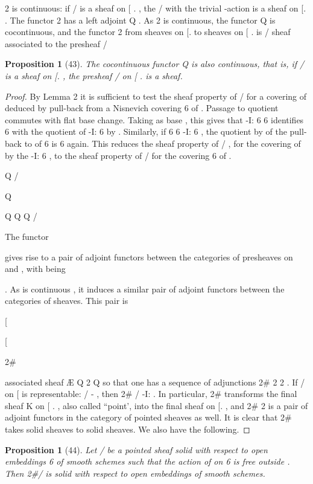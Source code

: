 \documentclass[11pt,a4paper]{article}
\theoremstyle{plain}
\newtheorem{proposition}[theorem]{Proposition}
\theoremstyle{definition}
\begin{document}
2 is continuous: if / is a sheaf on [ .   , the
  / with the trivial -action
is a sheaf on [.   . The functor 2 has a left adjoint Q
   . As 2
is continuous, the functor Q is cocontinuous, and the functor 2 from sheaves on
[.   to sheaves on [ .   is
/  sheaf associated to the presheaf   / 
\begin{proposition}[43]
The cocontinuous functor Q    is also continuous, that
is, if / is a sheaf on [.   , the presheaf   /  on [ .   is a sheaf.
\end{proposition}

\begin{proof} By Lemma 2 it is sufficient to test the sheaf property of   /  for a
covering of  deduced by pull-back from a Nisnevich covering 6
 of  .
Passage to quotient commutes with flat base change. Taking as base  , this gives
that
 -I: 6 6
identifies 6 with the quotient of  -I: 6 by . Similarly, if 6
6 -I: 6 ,
the quotient by of the pull-back to  of 6 is 6 again. This reduces the sheaf
property of   / , for the covering of  by the  -I: 6 , to the sheaf
property of / for the covering 6  of  .



Q
/ 


Q




Q  Q 
Q / 

The functor

gives rise to a pair of adjoint functors
between the categories of presheaves on
and
, with
being

. As
is continuous , it induces a similar pair of adjoint functors
between the categories of sheaves. This pair is



[ 

[

2\#

associated sheaf Æ Q  2 Q 
so that one has a sequence of adjunctions 2\#  2  2 . If / on [  is representable: /
- , then 2\# / 
-I: . In particular, 2\# transforms the final sheaf
K on [ .   , also called ``point', into the final sheaf on [.   , and 2\#  2 
is a pair of adjoint functors in the category of pointed sheaves as well. It is clear that
2\# takes solid sheaves to solid sheaves. We also have the following.
\end{proof}

\begin{proposition}[44]
Let / be a pointed sheaf solid with respect to open embeddings
  6 of smooth schemes such that the action of on 6 is free outside  . Then
2\#/  is solid with respect to open embeddings of smooth schemes.
\end{proposition}
\end{document}
